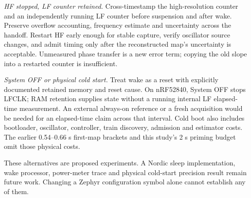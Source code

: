\documentclass[11pt,letterpaper]{article}
\begin{document}
\emph{HF stopped, LF counter retained.} Cross-timestamp the high-resolution counter and an independently running LF counter before suspension and after wake. Preserve overflow accounting, frequency estimate and uncertainty across the handoff. Restart HF early enough for stable capture, verify oscillator source changes, and admit timing only after the reconstructed map's uncertainty is acceptable. Unmeasured phase transfer is a new error term; copying the old slope into a restarted counter is insufficient.

\emph{System OFF or physical cold start.} Treat wake as a reset with explicitly documented retained memory and reset cause. On nRF52840, System OFF stops LFCLK; RAM retention supplies state without a running internal LF elapsed-time measurement. An external always-on reference or a fresh acquisition would be needed for an elapsed-time claim across that interval. Cold boot also includes bootloader, oscillator, controller, train discovery, admission and estimator costs. The earlier 0.54--0.66 s first-map brackets and this study's 2 s priming budget omit those physical costs.

These alternatives are proposed experiments. A Nordic sleep implementation, wake processor, power-meter trace and physical cold-start precision result remain future work. Changing a Zephyr configuration symbol alone cannot establish any of them.
\end{document}
